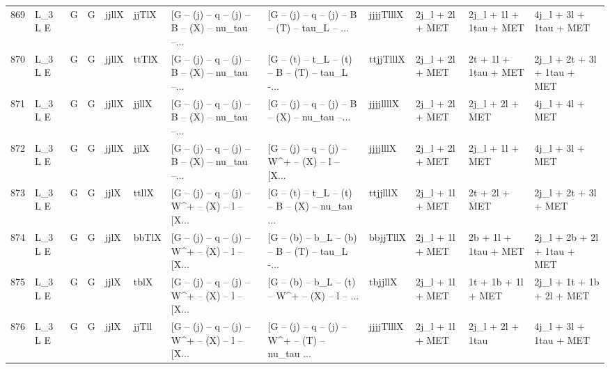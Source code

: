 \begin{tabular}{llllllllllll}
869  &      L\_3 L E &     G &     G &       jjllX &       jjTlX &  [G -- (j) -- q -- (j) -- B -- (X) -- nu\_tau --... &  [G -- (j) -- q -- (j) -- B -- (T) -- tau\_L -- ... &   jjjjTlllX &          2j\_l + 2l + MET &   2j\_l + 1l + 1tau + MET &             4j\_l + 3l + 1tau + MET \\
870  &      L\_3 L E &     G &     G &       jjllX &       ttTlX &  [G -- (j) -- q -- (j) -- B -- (X) -- nu\_tau --... &  [G -- (t) -- t\_L -- (t) -- B -- (T) -- tau\_L -... &   ttjjTlllX &          2j\_l + 2l + MET &     2t + 1l + 1tau + MET &        2j\_l + 2t + 3l + 1tau + MET \\
871  &      L\_3 L E &     G &     G &       jjllX &       jjllX &  [G -- (j) -- q -- (j) -- B -- (X) -- nu\_tau --... &  [G -- (j) -- q -- (j) -- B -- (X) -- nu\_tau --... &   jjjjllllX &          2j\_l + 2l + MET &          2j\_l + 2l + MET &                    4j\_l + 4l + MET \\
872  &      L\_3 L E &     G &     G &       jjllX &        jjlX &  [G -- (j) -- q -- (j) -- B -- (X) -- nu\_tau --... &  [G -- (j) -- q -- (j) -- W\textasciicircum + -- (X) -- l -- [X... &    jjjjlllX &          2j\_l + 2l + MET &          2j\_l + 1l + MET &                    4j\_l + 3l + MET \\
873  &      L\_3 L E &     G &     G &        jjlX &       ttllX &  [G -- (j) -- q -- (j) -- W\textasciicircum + -- (X) -- l -- [X... &  [G -- (t) -- t\_L -- (t) -- B -- (X) -- nu\_tau ... &    ttjjlllX &          2j\_l + 1l + MET &            2t + 2l + MET &               2j\_l + 2t + 3l + MET \\
874  &      L\_3 L E &     G &     G &        jjlX &       bbTlX &  [G -- (j) -- q -- (j) -- W\textasciicircum + -- (X) -- l -- [X... &  [G -- (b) -- b\_L -- (b) -- B -- (T) -- tau\_L -... &    bbjjTllX &          2j\_l + 1l + MET &     2b + 1l + 1tau + MET &        2j\_l + 2b + 2l + 1tau + MET \\
875  &      L\_3 L E &     G &     G &        jjlX &        tblX &  [G -- (j) -- q -- (j) -- W\textasciicircum + -- (X) -- l -- [X... &  [G -- (b) -- b\_L -- (t) -- W\textasciicircum + -- (X) -- l -- ... &     tbjjllX &          2j\_l + 1l + MET &       1t + 1b + 1l + MET &          2j\_l + 1t + 1b + 2l + MET \\
876  &      L\_3 L E &     G &     G &        jjlX &       jjTll &  [G -- (j) -- q -- (j) -- W\textasciicircum + -- (X) -- l -- [X... &  [G -- (j) -- q -- (j) -- W\textasciicircum + -- (T) -- nu\_tau ... &   jjjjTlllX &          2j\_l + 1l + MET &         2j\_l + 2l + 1tau &             4j\_l + 3l + 1tau + MET \\

\end{tabular}
